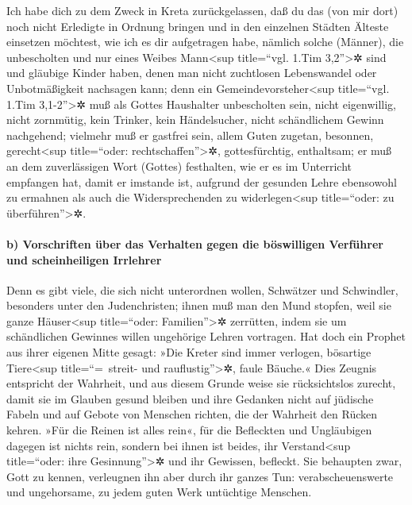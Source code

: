 Ich habe dich zu dem Zweck in Kreta zurückgelassen, daß
du das (von mir dort) noch nicht Erledigte in Ordnung bringen und in den
einzelnen Städten Älteste einsetzen möchtest, wie ich es dir aufgetragen
habe,  nämlich solche (Männer), die unbescholten und nur
eines Weibes Mann\textless sup title=``vgl. 1.Tim 3,2''\textgreater✲
sind und gläubige Kinder haben, denen man nicht zuchtlosen Lebenswandel
oder Unbotmäßigkeit nachsagen kann;  denn ein
Gemeindevorsteher\textless sup title=``vgl. 1.Tim 3,1-2''\textgreater✲
muß als Gottes Haushalter unbescholten sein, nicht eigenwillig, nicht
zornmütig, kein Trinker, kein Händelsucher, nicht schändlichem Gewinn
nachgehend;  vielmehr muß er gastfrei sein, allem Guten
zugetan, besonnen, gerecht\textless sup title=``oder:
rechtschaffen''\textgreater✲, gottesfürchtig, enthaltsam; 
er muß an dem zuverlässigen Wort (Gottes) festhalten, wie er es im
Unterricht empfangen hat, damit er imstande ist, aufgrund der gesunden
Lehre ebensowohl zu ermahnen als auch die Widersprechenden zu
widerlegen\textless sup title=``oder: zu überführen''\textgreater✲.

\hypertarget{b-vorschriften-uxfcber-das-verhalten-gegen-die-buxf6swilligen-verfuxfchrer-und-scheinheiligen-irrlehrer}{%
\paragraph{b) Vorschriften über das Verhalten gegen die böswilligen
Verführer und scheinheiligen
Irrlehrer}\label{b-vorschriften-uxfcber-das-verhalten-gegen-die-buxf6swilligen-verfuxfchrer-und-scheinheiligen-irrlehrer}}

 Denn es gibt viele, die sich nicht unterordnen wollen,
Schwätzer und Schwindler, besonders unter den Judenchristen;
 ihnen muß man den Mund stopfen, weil sie ganze
Häuser\textless sup title=``oder: Familien''\textgreater✲ zerrütten,
indem sie um schändlichen Gewinnes willen ungehörige Lehren vortragen.
 Hat doch ein Prophet aus ihrer eigenen Mitte gesagt:
»Die Kreter sind immer verlogen, bösartige Tiere\textless sup
title=``=~streit- und rauflustig''\textgreater✲, faule Bäuche.«
 Dies Zeugnis entspricht der Wahrheit, und aus diesem
Grunde weise sie rücksichtslos zurecht, damit sie im Glauben gesund
bleiben  und ihre Gedanken nicht auf jüdische Fabeln und
auf Gebote von Menschen richten, die der Wahrheit den Rücken kehren.
 »Für die Reinen ist alles rein«, für die Befleckten und
Ungläubigen dagegen ist nichts rein, sondern bei ihnen ist beides, ihr
Verstand\textless sup title=``oder: ihre Gesinnung''\textgreater✲ und
ihr Gewissen, befleckt.  Sie behaupten zwar, Gott zu
kennen, verleugnen ihn aber durch ihr ganzes Tun: verabscheuenswerte und
ungehorsame, zu jedem guten Werk untüchtige Menschen.

